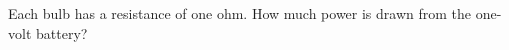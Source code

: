 Each bulb has a resistance of one ohm. How much power
is drawn from the one-volt battery?
\answercheck
